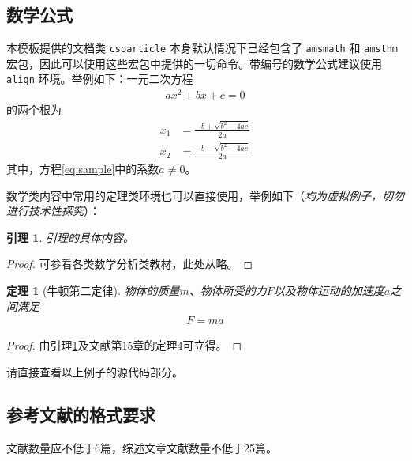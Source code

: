 \documentclass[UTF8]{csoarticle}
\newtheorem{theorem}{定理}
\newtheorem{lemma}{引理}
\begin{document}
\subsection{数学公式}

本模板提供的文档类 \verb|csoarticle| 本身默认情况下已经包含了 \verb|amsmath| 和 \verb|amsthm| 宏包，因此可以使用这些宏包中提供的一切命令。带编号的数学公式建议使用 \verb|align| 环境。举例如下：一元二次方程
\begin{align}\label{eq:sample}
    a x^2 + b x + c = 0
\end{align}
的两个根为
\begin{align}\label{eq:root}
    x_1 &= \frac{-b + \sqrt{b^2 - 4ac}}{2a} \\
    x_2 &= \frac{-b - \sqrt{b^2 - 4ac}}{2a}
\end{align}
其中，方程\eqref{eq:sample}中的系数$a \not= 0$。

数学类内容中常用的定理类环境也可以直接使用，举例如下（\emph{均为虚拟例子，切勿进行技术性探究}）：
\begin{lemma}\label{lem:levy}
    引理的具体内容。
\end{lemma}
\begin{proof}
    可参看各类数学分析类教材，此处从略。
\end{proof}

\begin{theorem}[牛顿第二定律]\label{thm:newton}
物体的质量$m$、物体所受的力$F$以及物体运动的加速度$a$之间满足
\begin{align}\label{eq:f-eq-ma}
    F = m a
\end{align}
\end{theorem}
\begin{proof}
由引理\ref{lem:levy}及文献\cite{bib1}第15章的定理4可立得。
\end{proof}

请直接查看以上例子的源代码部分。

\subsection{参考文献的格式要求}

文献数量应不低于6篇，综述文章文献数量不低于25篇。
\end{document}
